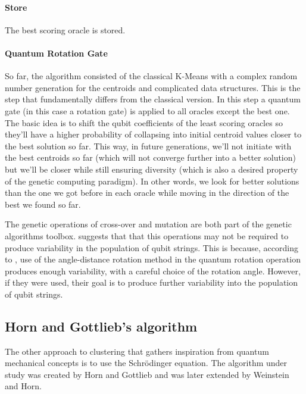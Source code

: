 \paragraph{Store}
The best scoring oracle is stored.

\paragraph{Quantum Rotation Gate}
So far, the algorithm consisted of the classical K-Means with a complex random number generation for the centroids and complicated data structures. This is the step that fundamentally differs from the classical version. In this step a quantum gate (in this case a rotation gate) is applied to all oracles except the best one. The basic idea is to shift the qubit coefficients of the least scoring oracles so they'll have a higher probability of collapsing into initial centroid values closer to the best solution so far. This way, in future generations, we'll not initiate with the best centroids so far (which will not converge further into a better solution) but we'll be closer while still ensuring diversity (which is also a desired property of the genetic computing paradigm). In other words, we look for better solutions than the one we got before in each oracle while moving in the direction of the best we found so far.


The genetic operations of cross-over and mutation are both part of the genetic algorithms toolbox. \cite{Wiebe2014} suggests that that this operations may not be required to produce variability in the population of qubit strings. This is because, according to \cite{Liu2010}, use of the angle-distance rotation method in the quantum rotation operation produces enough variability, with a careful choice of the rotation angle. However, if they were used, their goal is to produce further variability into the population of qubit strings.



\subsection{Horn and Gottlieb's algorithm}

The other approach to clustering that gathers inspiration from quantum mechanical concepts is to use the Schrödinger equation. The algorithm under study was created by Horn and Gottlieb and was later extended by Weinstein and Horn.

